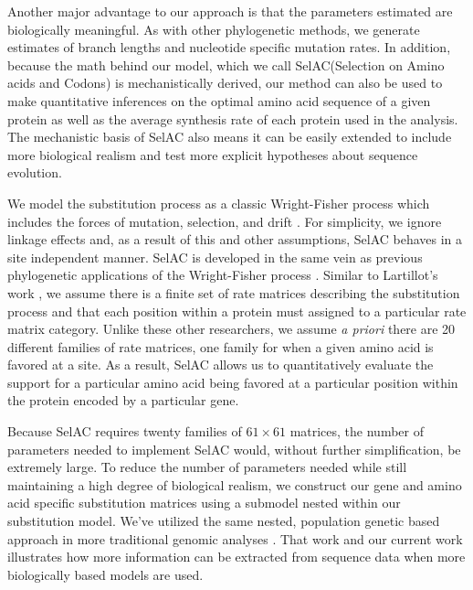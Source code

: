 \documentclass{article}
\newcommand{\selac}{SelAC\xspace}
\begin{document}
Another major advantage to our approach is that the parameters estimated are biologically meaningful.
As with other phylogenetic methods,  we generate estimates of branch lengths and nucleotide specific mutation rates.
In addition, because the math behind our model, which we call \selac (Selection on Amino acids and Codons) is mechanistically derived, our method can also be used to make quantitative inferences on the optimal amino acid sequence of a given protein as well as the average synthesis rate of each protein used in the analysis.
The mechanistic basis of \selac also means it can be easily extended to include more biological realism and test more explicit hypotheses about sequence evolution.

We model the substitution process as a classic Wright-Fisher process which includes the forces of mutation, selection, and drift \citep{Fisher1930,Kimura1962,Wright1969,Iwasa1988,BergAndLassig2003,SellaAndHirsh2005,McCandlishAndStoltzfus2014}.
For simplicity, we ignore linkage effects and, as a result of this and other assumptions, \selac behaves in a site independent manner.
\selac is developed in the same vein as previous phylogenetic applications of the Wright-Fisher process \citep[e.g.][]{MuseAndGaut1994,HalpernAndBruno1998,YangAndNielsen2008,RodrigueEtAl2005,KoshiAndGoldstein1997,KoshiEtAl1999,DimmicEtAl2000,ThorneEtAl2012,LartillotAndPhilippe2004,RodrigueAndLartillot2014}.
Similar to Lartillot's work \citep{LartillotAndPhilippe2004,RodrigueAndLartillot2014}, we assume there is a finite set of rate matrices describing the substitution process and that each position within a protein must assigned to a particular rate matrix category.
Unlike these other researchers, we assume \emph{a priori} there are 20 different families of rate matrices, one family for when a given amino acid is favored at a site.
As a result, \selac allows us to quantitatively evaluate the support for a particular amino acid being favored at a particular position within the protein encoded by a particular gene.

Because \selac requires twenty families of $61 \times 61$ matrices, the number of parameters needed to implement \selac would, without further simplification, be extremely large.
To reduce the number of parameters needed while still maintaining a high degree of biological realism, we construct our gene and amino acid specific substitution matrices using a submodel nested within our substitution model.
We've utilized the same nested, population genetic based approach in more traditional genomic analyses \citep[e.g.][]{Gilchrist2007,ShahAndGilchrist2011,GilchristEtAl2015}.
That work and our current work illustrates how more information can be extracted from sequence data when more biologically based models are used.
\end{document}
